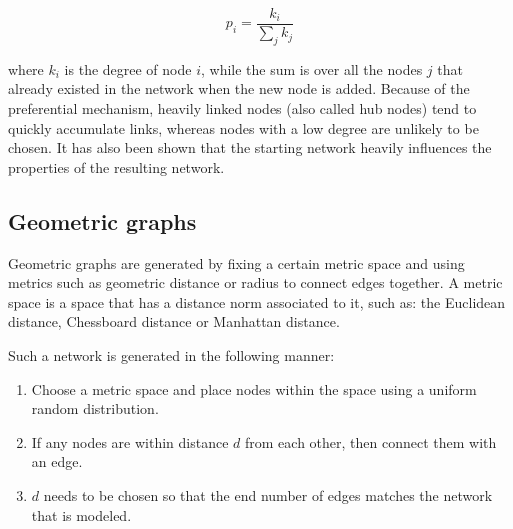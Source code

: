 \begin{equation}
 p_i = \frac{k_i}{\sum_{j}k_j}
\end{equation}

where $ k_i $ is the degree of node $i$, while the sum is over all the
nodes $j$ that already existed in the network when the new node is added. Because
of the preferential mechanism, heavily linked nodes (also called hub nodes)
tend to quickly accumulate links, whereas nodes with a low degree are unlikely
to be chosen. It has also been shown that the starting network heavily
influences the properties of the resulting network\cite{hormozdiari2007not}.

\subsection{Geometric graphs}

Geometric graphs are generated by fixing a certain metric space and using
metrics such as geometric distance or radius to connect edges together. A
metric space is a space that has a distance norm associated to it, such as: the
Euclidean distance, Chessboard distance or Manhattan distance.

Such a network is generated in the following manner:
\begin{enumerate}
 \item Choose a metric space and place nodes within the space using a uniform
random distribution.
 \item If any nodes are within distance $d$ from each other, then connect them
with an edge.
 \item $d$ needs to be chosen so that the end number of edges matches the network
that is modeled.
\end{enumerate}

